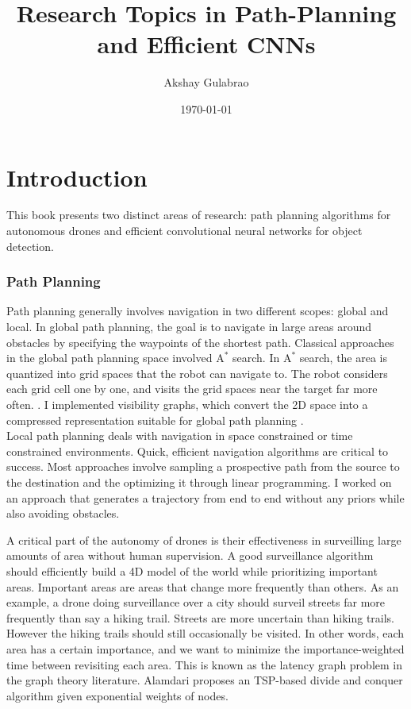 \documentclass[12pt]{book}
\title{Research Topics in Path-Planning and Efficient CNNs}
\author{Akshay Gulabrao}
\date{\today}
\begin{document}
\maketitle

\tableofcontents

\chapter{Introduction}
This book presents two distinct areas of research: path planning algorithms for autonomous drones and efficient convolutional neural networks for object detection.

\subsection{Path Planning}
Path planning generally involves navigation in two different scopes: global and local. In global path planning, the goal is to navigate in large areas around obstacles by specifying the waypoints of the shortest path. Classical approaches in the global path planning space involved $\text{A}^*$ search. In $\text{A}^*$ search, the area is quantized into grid spaces that the robot can navigate to. The robot considers each grid cell one by one, and visits the grid spaces near the target far more often.  \cite{hart1968formal}. I implemented visibility graphs, which convert the 2D space into a compressed representation suitable for global path planning \cite{lozano1979algorithm}.\\

Local path planning deals with navigation in space constrained or time constrained environments. Quick, efficient navigation algorithms are critical to success. Most approaches involve sampling a prospective path from the source to the destination and the optimizing it through linear programming. I worked on an approach that generates a trajectory from end to end without any priors while also avoiding obstacles.

A critical part of the autonomy of drones is their effectiveness in surveilling large amounts of area without human supervision. A good surveillance algorithm should efficiently build a 4D model of the world while prioritizing important areas. Important areas are areas that change more frequently than others. As an example, a drone doing surveillance over a city should surveil streets far more frequently than say a hiking trail. Streets are more uncertain than hiking trails. However the hiking trails should still occasionally be visited. In other words, each area has a certain importance, and we want to minimize the importance-weighted time between revisiting each area. This is known as the latency graph problem in the graph theory literature. Alamdari proposes an TSP-based divide and conquer algorithm given exponential weights of nodes. \cite{alamdari2012latency}
\end{document}

